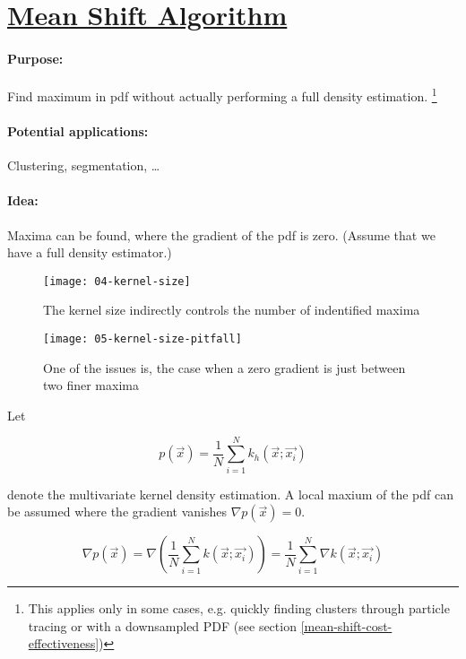 
\section{\href{http://ieeexplore.ieee.org/document/1000236/?arnumber=1000236&tag=1}{Mean Shift Algorithm}}

\paragraph{Purpose:}
Find maximum in pdf without actually performing a full density estimation. \footnote{This applies only in some cases, e.g. quickly finding clusters through particle tracing or with a downsampled PDF (see section \ref{mean-shift-cost-effectiveness})}

\paragraph{Potential applications:}
Clustering, segmentation, \ldots{}

\paragraph{Idea:} Maxima can be found, where the gradient of the pdf is zero. (Assume that we have a full density estimator.)

\begin{figure}[H]
  \centering
  \texttt{[image: 04-kernel-size]}
  \caption{The kernel size indirectly controls the number of indentified maxima}
\end{figure}
\begin{figure}[h]
  \label{mean-shift-issue}
  \centering
  \texttt{[image: 05-kernel-size-pitfall]}
  \caption{One of the issues is, the case when a zero gradient is just between two finer maxima}
\end{figure}

Let

\begin{equation*}
  p(\vec{x}) = \dfrac{1}{N} \sum_{i=1}^N k_h(\vec{x}; \vec{x_i})
\end{equation*}

denote the multivariate kernel density estimation. A local maxium of the pdf can be assumed where the gradient vanishes $\nabla p(\vec{x}) = 0$.

\begin{equation*}
  \nabla p(\vec{x}) = \nabla (\dfrac{1}{N} \sum_{i=1}^N k(\vec{x}; \vec{x_i})) =  \dfrac{1}{N} \sum_{i=1}^N \nabla k(\vec{x}; \vec{x_i})
\end{equation*}

